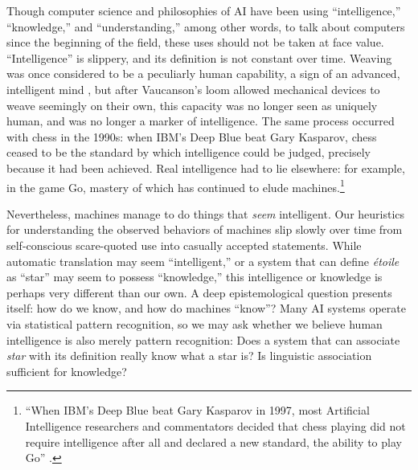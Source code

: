 Though computer science and philosophies of AI have been using
``intelligence,'' ``knowledge,'' and ``understanding,'' among other
words, to talk about computers since the beginning of the field, these
uses should not be taken at face value. ``Intelligence'' is slippery,
and its definition is not constant over time. Weaving was once considered to be a
peculiarly human capability, a sign of an advanced, intelligent
mind \cite[p. 627]{riskinDuck}, but after Vaucanson's loom allowed mechanical devices to weave
seemingly on their own, this capacity was no longer seen as uniquely
human, and was no longer a marker of intelligence. The same process
occurred with chess in the 1990s: when IBM's Deep Blue beat Gary
Kasparov, chess ceased to be the standard by which intelligence could
be judged, precisely because it had been achieved. Real intelligence
had to lie elsewhere: for example, in the game Go, mastery of which
has continued to elude machines.\footnote{``When IBM's Deep Blue beat
  Gary Kasparov in 1997, most Artificial Intelligence researchers and
  commentators decided that chess playing did not require intelligence
  after all and declared a new standard, the ability to play Go'' \cite[p. 623]{riskinDuck}.}

Nevertheless, machines manage to do things that \emph{seem}
intelligent. Our heuristics for understanding the observed 
behaviors of machines slip slowly over time from self-conscious
scare-quoted use into casually accepted statements. While automatic
translation may seem ``intelligent,'' or a system that can define \emph{\'{e}toile}
as ``star'' may seem to possess ``knowledge,'' this intelligence or
knowledge is perhaps very different than our own. A deep
epistemological question presents itself: how do we know, and how do
machines ``know''? Many AI systems operate via statistical pattern
recognition, so we may ask  whether we believe human intelligence is
also merely pattern recognition: Does a system that can associate \emph{star}
with its definition really know what a star is? Is linguistic
association sufficient for knowledge?


